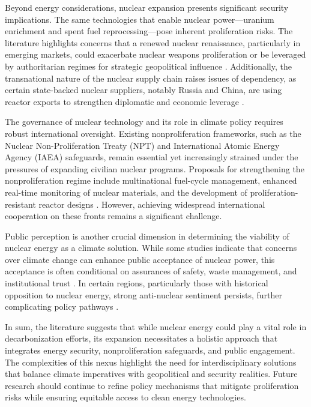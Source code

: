 \documentclass[11,5 pt]{article}
\begin{document}
Beyond energy considerations, nuclear expansion presents significant security implications. The same technologies that enable nuclear power—uranium enrichment and spent fuel reprocessing—pose inherent proliferation risks. The literature highlights concerns that a renewed nuclear renaissance, particularly in emerging markets, could exacerbate nuclear weapons proliferation or be leveraged by authoritarian regimes for strategic geopolitical influence \cite{Goldschmidt2010multilateral}. Additionally, the transnational nature of the nuclear supply chain raises issues of dependency, as certain state-backed nuclear suppliers, notably Russia and China, are using reactor exports to strengthen diplomatic and economic leverage \cite{Nguyen}.

The governance of nuclear technology and its role in climate policy requires robust international oversight. Existing nonproliferation frameworks, such as the Nuclear Non-Proliferation Treaty (NPT) and International Atomic Energy Agency (IAEA) safeguards, remain essential yet increasingly strained under the pressures of expanding civilian nuclear programs. Proposals for strengthening the nonproliferation regime include multinational fuel-cycle management, enhanced real-time monitoring of nuclear materials, and the development of proliferation-resistant reactor designs \cite{scheffran2015climate}. However, achieving widespread international cooperation on these fronts remains a significant challenge.

Public perception is another crucial dimension in determining the viability of nuclear energy as a climate solution. While some studies indicate that concerns over climate change can enhance public acceptance of nuclear power, this acceptance is often conditional on assurances of safety, waste management, and institutional trust \cite{CORNER20114823}. In certain regions, particularly those with historical opposition to nuclear energy, strong anti-nuclear sentiment persists, further complicating policy pathways \cite{Doyle}.

In sum, the literature suggests that while nuclear energy could play a vital role in decarbonization efforts, its expansion necessitates a holistic approach that integrates energy security, nonproliferation safeguards, and public engagement. The complexities of this nexus highlight the need for interdisciplinary solutions that balance climate imperatives with geopolitical and security realities. Future research should continue to refine policy mechanisms that mitigate proliferation risks while ensuring equitable access to clean energy technologies. 

\newpage

\printbibliography
\end{document}
